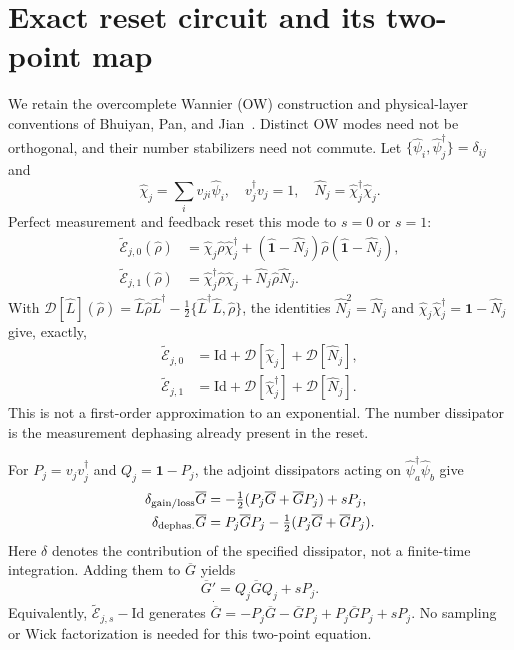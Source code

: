 \documentclass[aps,prb,twocolumn,nofootinbib,superscriptaddress]{revtex4-2}
\newcommand{\Id}{\hat{\mathbf{1}}}
\newcommand{\id}{\mathbf{1}}
\newcommand{\E}{\widetilde{\mathcal E}}
\newcommand{\D}{\mathcal D}
\begin{document}
\section{Exact reset circuit and its two-point map}
We retain the overcomplete Wannier (OW) construction and physical-layer
conventions of Bhuiyan, Pan, and Jian~\cite{BPJ}. Distinct OW modes need not
be orthogonal, and their number stabilizers need not commute.
Let $\{\hat\psi_i,\hat\psi_j^\dagger\}=\delta_{ij}$ and
\begin{equation}
 \hat\chi_j=\sum_i v_{ji}\hat\psi_i,\quad
 v_j^\dagger v_j=1,\quad \hat N_j=\hat\chi_j^\dagger\hat\chi_j.
\end{equation}
Perfect measurement and feedback reset this mode to $s=0$ or $s=1$:
\begin{align}
 \E_{j,0}(\hat\rho)&=\hat\chi_j\hat\rho\hat\chi_j^\dagger
 +(\Id-\hat N_j)\hat\rho(\Id-\hat N_j),\nonumber\\
 \E_{j,1}(\hat\rho)&=\hat\chi_j^\dagger\hat\rho\hat\chi_j
 +\hat N_j\hat\rho\hat N_j.\label{eq:reset}
\end{align}
With $\D[\hat L](\hat\rho)=\hat L\hat\rho\hat L^\dagger
-\tfrac12\{\hat L^\dagger\hat L,\hat\rho\}$, the identities
$\hat N_j^2=\hat N_j$ and $\hat\chi_j\hat\chi_j^\dagger=\Id-\hat N_j$
give, exactly,
\begin{align}
 \E_{j,0}&=\mathrm{Id}+\D[\hat\chi_j]+\D[\hat N_j],\nonumber\\
 \E_{j,1}&=\mathrm{Id}+\D[\hat\chi_j^\dagger]+\D[\hat N_j].
 \label{eq:idplusL}
\end{align}
This is not a first-order approximation to an exponential. The number
dissipator is the measurement dephasing already present in the reset.

For $P_j=v_jv_j^\dagger$ and $Q_j=\id-P_j$, the adjoint dissipators
acting on $\hat\psi_a^\dagger\hat\psi_b$ give
\begin{align}
 \delta_{\rm gain/loss}\overline G
 &=-\tfrac12(P_j\overline G+\overline GP_j)+sP_j,\nonumber\\
 \delta_{\rm dephas.}\overline G
 &=P_j\overline GP_j-\tfrac12(P_j\overline G+\overline GP_j).
 \label{eq:covD}
\end{align}
Here $\delta$ denotes the contribution of the specified dissipator,
not a finite-time integration. Adding them to $\overline G$ yields
\begin{equation}
 \overline G'=Q_j\overline GQ_j+sP_j.\label{eq:elementaryG}
\end{equation}
Equivalently, $\E_{j,s}-\mathrm{Id}$ generates
$\dot{\overline G}=-P_j\overline G-\overline GP_j+P_j\overline GP_j+sP_j$.
No sampling or Wick factorization is needed for this two-point equation.
\end{document}
